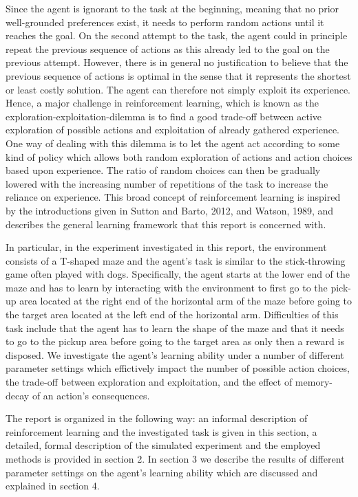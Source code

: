 Since the agent is ignorant to the task at the beginning, meaning that no prior well-grounded preferences exist, it needs to perform random actions until it reaches the goal. On the second attempt to the task, the agent could in principle repeat the previous sequence of actions as this already led to the goal on the previous attempt. However, there is in general no justification to believe that the previous sequence of actions is optimal in the sense that it represents the shortest or least costly solution. The agent can therefore not simply exploit its experience. Hence, a major challenge in reinforcement learning, which is known as the exploration-exploitation-dilemma is to find a good trade-off between active exploration of possible actions and exploitation of already gathered experience. One way of dealing with this dilemma is to let the agent act according to some kind of policy which allows both random exploration of actions and action choices based upon experience. The ratio of random choices can then be gradually lowered with the increasing number of repetitions of the task to increase the reliance on experience. This broad concept of reinforcement learning is inspired by the introductions given in Sutton and Barto, 2012, and Watson, 1989, and describes the general learning framework that this report is concerned with. 

In particular, in the experiment investigated in this report, the environment consists of a T-shaped maze and the agent's task is similar to the stick-throwing game often played with dogs. Specifically, the agent starts at the lower end of the maze and has to learn by interacting with the environment to first go to the pick-up area located at the right end of the horizontal arm of the maze before going to the target area located at the left end of the horizontal arm. Difficulties of this task include that the agent has to learn the shape of the maze and that it needs to go to the pickup area before going to the target area as only then a reward is disposed. We investigate the agent's learning ability under a number of different parameter settings which effictively impact the number of possible action choices, the trade-off between exploration and exploitation, and the effect of memory-decay of an action's consequences.

The report is organized in the following way: an informal description of reinforcement learning and the investigated task is given in this section, a detailed, formal description of the simulated experiment and the employed methods is provided in section 2. In section 3 we describe the results of different parameter settings on the agent's learning ability which are discussed and explained in section 4.


